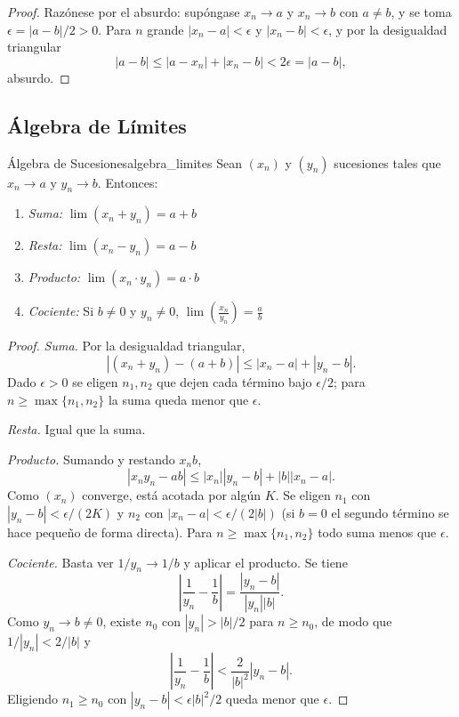 \documentclass[11pt, a4paper]{article}
\begin{document}
\begin{proof}
Razónese por el absurdo: supóngase $x_n \to a$ y $x_n \to b$ con $a \ne b$, y se toma
$\epsilon = |a-b|/2 > 0$. Para $n$ grande
$|x_n - a| < \epsilon$ y $|x_n - b| < \epsilon$, y por la desigualdad triangular
$$ |a - b| \le |a - x_n| + |x_n - b| < 2\epsilon = |a-b|, $$
absurdo.
\end{proof}

\subsection{Álgebra de Límites}

\begin{teorema}{Álgebra de Sucesiones}{algebra_limites}
Sean $(x_n)$ y $(y_n)$ sucesiones tales que $x_n \to a$ y $y_n \to b$. Entonces:
\begin{enumerate}
    \item \textit{Suma:} $\lim (x_n + y_n) = a + b$
    \item \textit{Resta:} $\lim (x_n - y_n) = a - b$
    \item \textit{Producto:} $\lim (x_n \cdot y_n) = a \cdot b$
    \item \textit{Cociente:} Si $b \neq 0$ y $y_n \neq 0$,
    $\lim \left(\frac{x_n}{y_n}\right) = \frac{a}{b}$
\end{enumerate}
\end{teorema}

\begin{proof}
\textit{Suma.} Por la desigualdad triangular,
$$ |(x_n + y_n) - (a + b)| \le |x_n - a| + |y_n - b|. $$
Dado $\epsilon > 0$ se eligen $n_1, n_2$ que dejen cada término bajo $\epsilon/2$; para
$n \ge \max\{n_1, n_2\}$ la suma queda menor que $\epsilon$.

\textit{Resta.} Igual que la suma.

\textit{Producto.} Sumando y restando $x_n b$,
$$ |x_n y_n - ab| \le |x_n||y_n - b| + |b||x_n - a|. $$
Como $(x_n)$ converge, está acotada por algún $K$. Se eligen $n_1$ con
$|y_n - b| < \epsilon/(2K)$ y $n_2$ con $|x_n - a| < \epsilon/(2|b|)$ (si $b = 0$ el segundo
término se hace pequeño de forma directa). Para $n \ge \max\{n_1, n_2\}$ todo suma menos que
$\epsilon$.

\textit{Cociente.} Basta ver $1/y_n \to 1/b$ y aplicar el producto. Se tiene
$$ \left| \frac{1}{y_n} - \frac{1}{b} \right| = \frac{|y_n - b|}{|y_n||b|}. $$
Como $y_n \to b \ne 0$, existe $n_0$ con $|y_n| > |b|/2$ para $n \ge n_0$, de modo que
$1/|y_n| < 2/|b|$ y
$$ \left| \frac{1}{y_n} - \frac{1}{b} \right| < \frac{2}{|b|^2} |y_n - b|. $$
Eligiendo $n_1 \ge n_0$ con $|y_n - b| < \epsilon |b|^2 / 2$ queda menor que $\epsilon$.
\end{proof}
\end{document}
